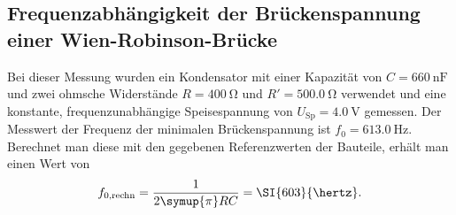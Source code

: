 \subsection{Frequenzabhängigkeit der Brückenspannung einer Wien-Robinson-Brücke} 
\FloatBarrier
Bei dieser Messung wurden ein Kondensator mit einer Kapazität von $C=\SI{660}{\nano\farad}$ und zwei ohmsche Widerstände 
$R=\SI{400}{\ohm}$ und $R'=\SI{500.0}{\ohm}$ verwendet und eine konstante, frequenzunabhängige Speisespannung von
$U_\text{Sp}=\SI{4.0}{\volt}$ gemessen.
Der Messwert der Frequenz der minimalen Brückenspannung ist ${f_0=\SI{613.0}{\hertz}}$. 
Berechnet man diese mit den gegebenen Referenzwerten der Bauteile, erhält man einen Wert von 
\begin{equation}
    f_{0\text{,rechn}}=\frac{1}{2 \symup{\pi} RC}=\SI{603}{\hertz} .
\end{equation}

